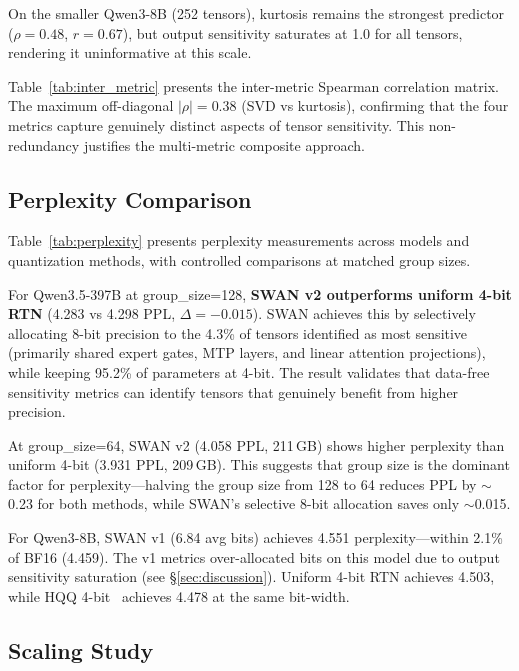 \documentclass{article}
\begin{document}
On the smaller Qwen3-8B (252 tensors), kurtosis remains the strongest predictor ($\rho = 0.48$, $r = 0.67$), but output sensitivity saturates at 1.0 for all tensors, rendering it uninformative at this scale.



Table~\ref{tab:inter_metric} presents the inter-metric Spearman correlation matrix. The maximum off-diagonal $|\rho| = 0.38$ (SVD vs kurtosis), confirming that the four metrics capture genuinely distinct aspects of tensor sensitivity. This non-redundancy justifies the multi-metric composite approach.

\subsection{Perplexity Comparison}



Table~\ref{tab:perplexity} presents perplexity measurements across models and quantization methods, with controlled comparisons at matched group sizes.

For Qwen3.5-397B at group\_size=128, \textbf{SWAN v2 outperforms uniform 4-bit RTN} (4.283 vs 4.298 PPL, $\Delta = -0.015$). SWAN achieves this by selectively allocating 8-bit precision to the 4.3\% of tensors identified as most sensitive (primarily shared expert gates, MTP layers, and linear attention projections), while keeping 95.2\% of parameters at 4-bit. The result validates that data-free sensitivity metrics can identify tensors that genuinely benefit from higher precision.

At group\_size=64, SWAN v2 (4.058 PPL, 211\,GB) shows higher perplexity than uniform 4-bit (3.931 PPL, 209\,GB). This suggests that group size is the dominant factor for perplexity---halving the group size from 128 to 64 reduces PPL by $\sim$0.23 for both methods, while SWAN's selective 8-bit allocation saves only $\sim$0.015.

For Qwen3-8B, SWAN v1 (6.84 avg bits) achieves 4.551 perplexity---within 2.1\% of BF16 (4.459). The v1 metrics over-allocated bits on this model due to output sensitivity saturation (see \S\ref{sec:discussion}). Uniform 4-bit RTN achieves 4.503, while HQQ 4-bit~\cite{badri2024hqq} achieves 4.478 at the same bit-width.

\subsection{Scaling Study}
\end{document}
